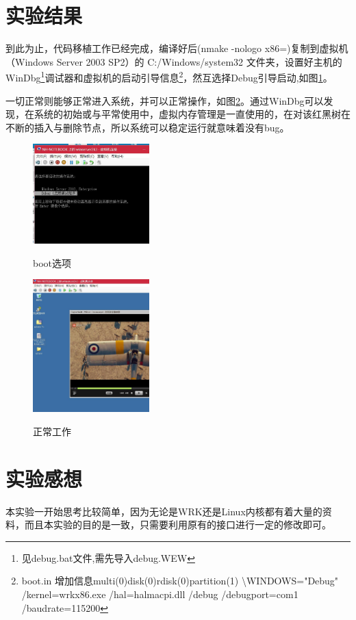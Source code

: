 \section{实验结果}
到此为止，代码移植工作已经完成，编译好后(nmake -nologo x86=)复制到虚拟机（Windows Server 2003 SP2）的 C:/Windows/system32 文件夹，设置好主机的WinDbg\footnote{见debug.bat文件,需先导入debug.WEW}调试器和虚拟机的启动引导信息\footnote{boot.in 增加信息multi(0)disk(0)rdisk(0)partition(1)
\textbackslash WINDOWS="Debug" /kernel=wrkx86.exe /hal=halmacpi.dll /debug /debugport=com1 /baudrate=115200}，然互选择Debug引导启动,如图\ref{boot}。

一切正常则能够正常进入系统，并可以正常操作，如图\ref{video}。通过WinDbg可以发现，在系统的初始或与平常使用中，虚拟内存管理是一直使用的，在对该红黑树在不断的插入与删除节点，所以系统可以稳定运行就意味着没有bug。

\begin{figure}
    \centering
    \includegraphics[width=0.4\textwidth]{2.jpg}\\
    \caption{boot选项\label{boot}}
\end{figure}

\begin{figure}
    \centering
    \includegraphics[width=0.4\textwidth]{1.jpg}\\
    \caption{正常工作\label{video}}
\end{figure}

\section{实验感想}
本实验一开始思考比较简单，因为无论是WRK还是Linux内核都有着大量的资料，而且本实验的目的是一致，只需要利用原有的接口进行一定的修改即可。

